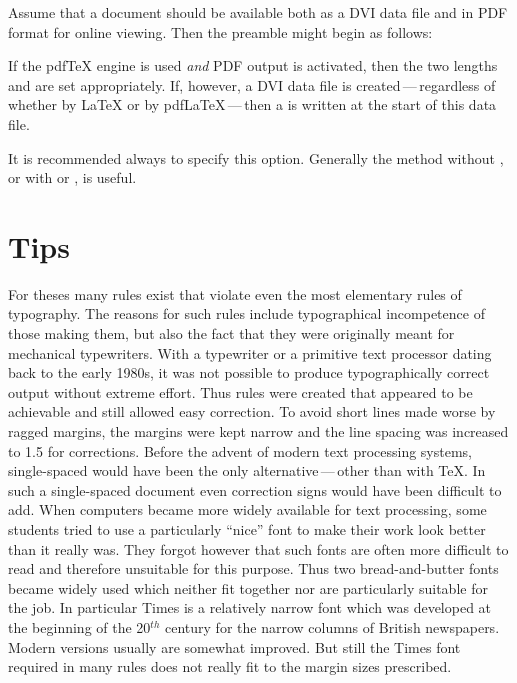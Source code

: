 \begin{Example}
  Assume that a document should be available both as a DVI data file
  and in PDF format for online viewing. Then the preamble might begin
  as follows:
If the {pdf\TeX} engine is used \emph{and} PDF output is
activated, then the two lengths  and
 are set appropriately.  If, however, a DVI data
file is created\,---\,regardless of whether by {\LaTeX} or by
{pdf\LaTeX}\,---\,then a  is written at the start of
this data file.
\end{Example}%
It is recommended always to specify this option. Generally the method
without , or with  or
, is useful.%
%
%
%


\section{Tips}
\label{sec:typearea.tips}

For theses  many rules exist that violate even the most
elementary rules of typography. The reasons for such rules include
typographical incompetence of those making them, but also the fact
that they were originally meant for mechanical typewriters. With a
typewriter or a primitive text processor dating back to the early
1980s, it was not possible to produce typographically correct output
without extreme effort. Thus rules were created that appeared to be
achievable and still allowed easy correction. To avoid short lines
made worse by ragged margins, the margins were kept narrow and the
line spacing was increased to 1.5 for corrections. Before the advent
of modern text processing systems, single-spaced would have been the
only alternative\,---\,other than with \TeX. In such a single-spaced
document even correction signs would have been difficult to add. When
computers became more widely available for text processing, some
students tried to use a particularly ``nice'' font to make their work
look better than it really was. They forgot however that such fonts
are often more difficult to read and therefore unsuitable for this
purpose. Thus two bread-and-butter fonts became widely used which
neither fit together nor are particularly suitable for the job. In
particular Times is a relatively narrow font which was developed at
the beginning of the 20$^{th}$ century for the narrow columns of
British newspapers. Modern versions usually are somewhat improved. But
still the Times font required in many rules does not really fit to the
margin sizes prescribed.

